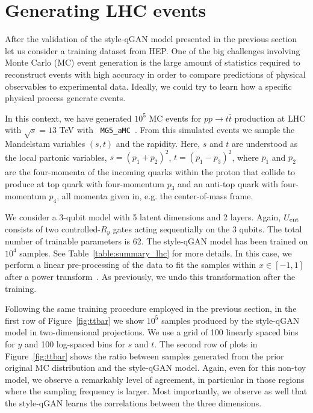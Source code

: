 \documentclass[twocolumn,preprintnumbers,superscriptaddress]{revtex4-2}
\begin{document}
\section{Generating LHC events}
\label{sec:lhc}

After the validation of the style-qGAN model presented in the previous section
let us consider a training dataset from HEP. One of the big challenges involving
Monte Carlo (MC) event generation is the large amount of statistics required to
reconstruct events with high accuracy in order to compare predictions of
physical observables to experimental data. Ideally, we could try
to learn how a specific physical process generate events.

In this context, we have generated $10^5$ MC events for $pp\rightarrow t\bar{t}$
production at LHC with $\sqrt{s} = 13$ TeV with {\tt
MG5\_aMC}~\cite{Alwall:2014hca,Frederix:2018nkq}. From this simulated events we
sample the Mandelstam variables $(s,t)$ and the rapidity. Here, $s$
and $t$ are understood as the local partonic variables,
$s=(p_1^{}+p_2^{})^2$, $t=(p_1^{}-p_3^{})_{}^2$, where $p_1^{}$ and
$p_2^{}$ are the four-momenta of the incoming quarks within the proton that collide to produce at top quark with four-momentum $p_3^{}$ and an anti-top quark with four-momentum $p_4^{}$, all momenta given in, e.g. the center-of-mass frame.

We consider a 3-qubit model with 5 latent dimensions and 2 layers. Again,
$U_{\rm ent}$ consists of two controlled-$R_{y}$ gates acting sequentially on
the 3 qubits. The total number of trainable parameters is 62. The style-qGAN
model has been trained on $10^4$ samples. See Table~\ref{table:summary_lhc} for more details. In this case, we perform a linear pre-processing of the data
to fit the samples within $x \in [-1, 1]$ after a power
transform~\cite{yeo2000new}. As previously, we undo this transformation after
the training.

Following the same training procedure employed in the previous section, in the
first row of Figure~\ref{fig:ttbar} we show $10^5$ samples produced by the
style-qGAN model in two-dimensional projections. We use a grid of 100 linearly
spaced bins for $y$ and 100 log-spaced bins for $s$ and $t$.
%
The second row of plots in Figure~\ref{fig:ttbar} shows the ratio between
samples generated from the prior original MC distribution and the style-qGAN
model. Again, even for this non-toy model, we observe a remarkably level of agreement, in particular in those regions
where the sampling frequency is larger. Most importantly, we observe as well that the style-qGAN learns
the correlations between the three dimensions.
\end{document}
